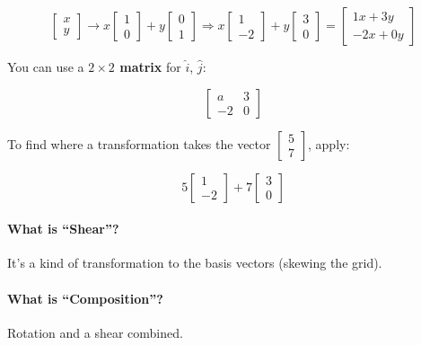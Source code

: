 \[
\begin{bmatrix} x \\ y \end{bmatrix}
\rightarrow
x\begin{bmatrix} 1 \\ 0 \end{bmatrix} + y\begin{bmatrix} 0 \\ 1 \end{bmatrix}
\Rightarrow
x\begin{bmatrix} 1 \\ -2 \end{bmatrix} + y\begin{bmatrix} 3 \\ 0 \end{bmatrix}
= \begin{bmatrix} 1x+3y \\ -2x+0y \end{bmatrix}
\]

You can use a \textbf{$2\times2$ matrix} for $\hat{i}$, $\hat{j}$:

\[
\begin{bmatrix} a & 3 \\ -2 & 0 \end{bmatrix}
\]

To find where a transformation takes the vector $\begin{bmatrix} 5 \\ 7 \end{bmatrix}$, apply:

\[
5\begin{bmatrix} 1 \\ -2 \end{bmatrix} + 7\begin{bmatrix} 3 \\ 0 \end{bmatrix}
\]

\paragraph{What is ``Shear''?}
\begin{defbox}
It's a kind of transformation to the basis vectors (skewing the grid).
\end{defbox}

\paragraph{What is ``Composition''?}
\begin{defbox}
Rotation and a shear combined.
\end{defbox}

